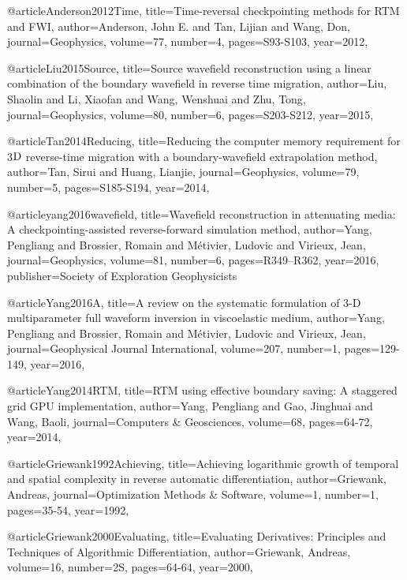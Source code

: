 {@article{Anderson2012Time,
  title={Time-reversal checkpointing methods for {RTM} and {FWI}},
  author={Anderson, John E. and Tan, Lijian and Wang, Don},
  journal={Geophysics},
  volume={77},
  number={4},
  pages={S93-S103},
  year={2012},
}

@article{Liu2015Source,
  title={Source wavefield reconstruction using a linear combination of the boundary wavefield in reverse time migration},
  author={Liu, Shaolin and Li, Xiaofan and Wang, Wenshuai and Zhu, Tong},
  journal={Geophysics},
  volume={80},
  number={6},
  pages={S203-S212},
  year={2015},
}

@article{Tan2014Reducing,
  title={Reducing the computer memory requirement for 3$\textnormal{D}$ reverse-time migration with a boundary-wavefield extrapolation method},
  author={Tan, Sirui and Huang, Lianjie},
  journal={Geophysics},
  volume={79},
  number={5},
  pages={S185-S194},
  year={2014},
}

@article{yang2016wavefield,
  title={Wavefield reconstruction in attenuating media: A checkpointing-assisted reverse-forward simulation method},
  author={Yang, Pengliang and Brossier, Romain and M{\'e}tivier, Ludovic and Virieux, Jean},
  journal={Geophysics},
  volume={81},
  number={6},
  pages={R349--R362},
  year={2016},
  publisher={Society of Exploration Geophysicists}
}

@article{Yang2016A,
  title={A review on the systematic formulation of 3-{D} multiparameter full waveform inversion in viscoelastic medium},
  author={Yang, Pengliang and Brossier, Romain and Métivier, Ludovic and Virieux, Jean},
  journal={Geophysical Journal International},
  volume={207},
  number={1},
  pages={129-149},
  year={2016},
}

@article{Yang2014RTM,
  title={{RTM} using effective boundary saving: A staggered grid GPU implementation},
  author={Yang, Pengliang and Gao, Jinghuai and Wang, Baoli},
  journal={Computers \& Geosciences},
  volume={68},
  pages={64-72},
  year={2014},
}


@article{Griewank1992Achieving,
  title={Achieving logarithmic growth of temporal and spatial complexity in reverse automatic differentiation},
  author={Griewank, Andreas},
  journal={Optimization Methods \& Software},
  volume={1},
  number={1},
  pages={35-54},
  year={1992},
}

@article{Griewank2000Evaluating,
  title={Evaluating Derivatives: Principles and Techniques of Algorithmic Differentiation},
  author={Griewank, Andreas},
  volume={16},
  number={2S},
  pages={64-64},
  year={2000},
}

}
